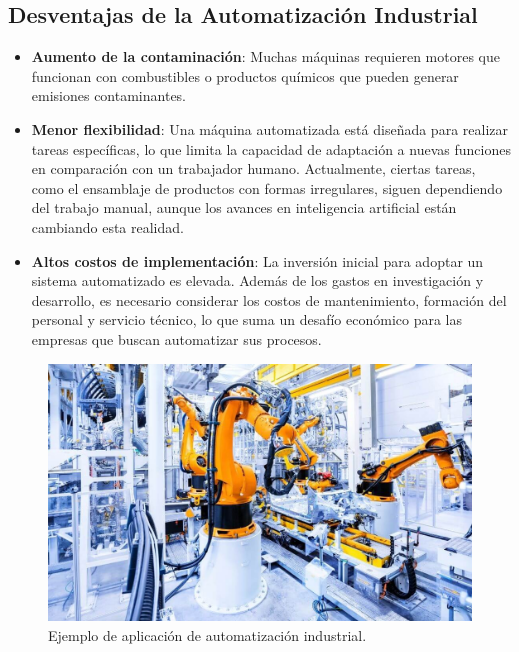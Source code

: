 \subsection{Desventajas de la Automatización Industrial}

\begin{itemize}
    \item \textbf{Aumento de la contaminación}: Muchas máquinas requieren motores que funcionan con combustibles o productos químicos que pueden generar emisiones contaminantes.
    
    \item \textbf{Menor flexibilidad}: Una máquina automatizada está diseñada para realizar tareas específicas, lo que limita la capacidad de adaptación a nuevas funciones en comparación con un trabajador humano. Actualmente, ciertas tareas, como el ensamblaje de productos con formas irregulares, siguen dependiendo del trabajo manual, aunque los avances en inteligencia artificial están cambiando esta realidad.
    
    \item \textbf{Altos costos de implementación}: La inversión inicial para adoptar un sistema automatizado es elevada. Además de los gastos en investigación y desarrollo, es necesario considerar los costos de mantenimiento, formación del personal y servicio técnico, lo que suma un desafío económico para las empresas que buscan automatizar sus procesos.
\end{itemize}

\begin{figure} [h!]
  \begin{center}
    \includegraphics[width=12cm]{figs/automatizacion_industrial.jpg}
  \end{center}
  \caption{\centering Ejemplo de aplicación de automatización industrial.}
  \label{fig:automatizacion_industrial}
\end{figure}

